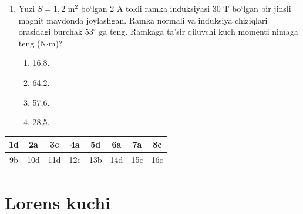 \begin{enumerate}
\item Yuzi $S=1,2$ m$^2$ bo‘lgan 2 A tokli ramka induksiyasi 30 T bo‘lgan bir jinsli magnit maydonda joylashgan. Ramka normali va induksiya chiziqlari orasidagi burchak $53^\circ$ ga teng. Ramkaga ta’sir qiluvchi kuch momenti nimaga teng (N$\cdot$m)?
\begin{enumerate}[label=\Alph*)]
\item 16,8.
\item 64,2.
\item 57,6.
\item 28,5.
\end{enumerate}

\end{enumerate}




\begin{table}[!ht]
\centering
\begin{tabular}{|c|c|c|c|c|c|c|c|}
\hline
1d & 2a & 3c & 4a & 5d & 6a & 7a & 8c \\ \hline
9b & 10d & 11d & 12c & 13b & 14d & 15c & 16c \\ \hline
\end{tabular}
\end{table}












\section{Lorens kuchi}



